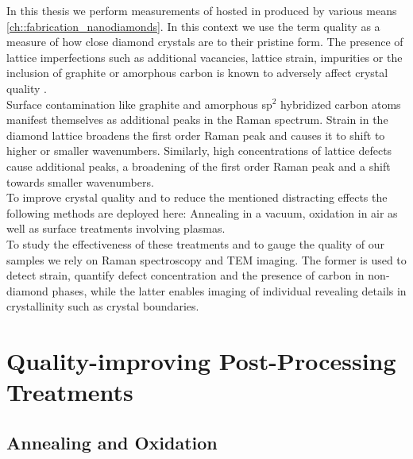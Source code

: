 		In this thesis we perform measurements of \sivs hosted in \nds produced by various means \autoref{ch::fabrication_nanodiamonds}.
		In this context we use the term quality as a measure of how close diamond crystals are to their pristine form.
		The presence of lattice imperfections such as additional vacancies, lattice strain, impurities or the inclusion of graphite or amorphous carbon is known to adversely affect crystal quality \cite{Zaitsev2001,Prawer2004,Orwa2000}.
		\\
		Surface contamination like graphite and amorphous sp$^2$ hybridized carbon atoms manifest themselves as additional peaks in the Raman spectrum.
		Strain in the diamond lattice broadens the first order Raman peak and causes it to shift to higher or smaller wavenumbers.
		Similarly, high concentrations of lattice defects cause additional peaks, a broadening of the first order Raman peak and a shift towards smaller wavenumbers.
		\\
		To improve crystal quality and to reduce the mentioned distracting effects the following methods are deployed here: Annealing in a vacuum, oxidation in air as well as surface treatments involving plasmas.
		\\
		To study the effectiveness of these treatments and to gauge the quality of our \nd samples we rely on Raman spectroscopy and TEM imaging. The former is used to detect strain, quantify defect concentration and the presence of carbon in non-diamond phases, while the latter enables imaging of individual \nds revealing details in crystallinity such as crystal boundaries.

		\section{Quality-improving Post-Processing Treatments}

			\subsection{Annealing and Oxidation}\label{subsection::ann_ox}

